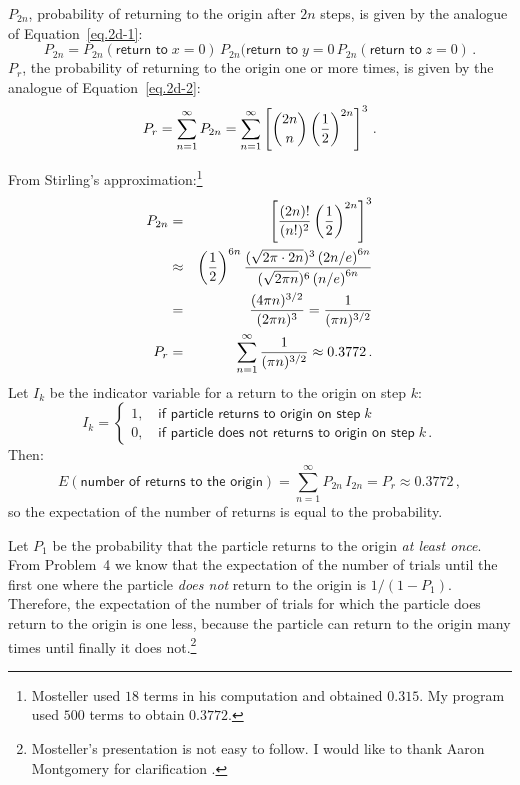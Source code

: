 $P_{2n}$, probability of returning to the origin after $2n$ steps, is given by the analogue of Equation~\ref{eq.2d-1}:
\[
P_{2n} =
P_{2n}(\textsf{return to}\;x=0)\,P_{2n}(\textsf{return to}\;y=0\, P_{2n}(\textsf{return to}\;z=0)\,.
\]
$P_r$, the probability of returning to the origin one or more times, is given by the analogue of Equation~\ref{eq.2d-2}:
\[
P_r =\sum_{n=1}^{\infty}P_{2n} =
\sum_{n=1}^{\infty}\left[\displaystyle{2n \choose n}\left(\displaystyle\frac{1}{2}\right)^{2n}\right]^3\,.
\]

From Stirling's approximation:\footnote{Mosteller used $18$ terms in his computation and obtained $0.315$. My program used $500$ terms to obtain $0.3772$.}
\begin{eqnarray*}
P_{2n} &=&
\left[\displaystyle\frac{(2n)!}{(n!)^2}
\left(\displaystyle\frac{1}{2}\right)^{2n}\right]^3 \\
&\approx&
\left(\displaystyle\frac{1}{2}\right)^{6n}
\displaystyle\frac{(\sqrt{2\pi \cdot 2n})^3
         \left(2n/e\right)^{6n}}{(\sqrt{2\pi n})^{6}
         \left(n/e\right)^{6n}} \\
&=&\displaystyle\frac{(4\pi n)^{3/2}}{(2\pi n)^3}=
 \displaystyle\frac{1}{(\pi n)^{3/2}}\\
P_r &=& \sum_{n=1}^{\infty}\displaystyle\frac{1}{(\pi n)^{3/2}}\approx 0.3772\,.
\end{eqnarray*}
Let $I_k$ be the indicator variable for a return to the origin on step $k$:
\begin{equation}
I_k=
\left\{
\begin{array}{ll}
1,\quad\textsf{if particle returns to origin on step}\;k\\
0, \quad\textsf{if particle does not returns to origin on step}\;k\,.
\end{array}
\right.
\end{equation}
Then:
\[
E(\textsf{number of returns to the origin})=\sum_{n=1}^{\infty}P_{2n}\, I_{2n} = P_r\approx 0.3772\,,
\]
so the expectation of the number of returns is equal to the probability.

 Let $P_1$ be the probability that the particle returns to the origin \emph{at least once}.  From Problem~4 we know that the expectation of the number of trials until the first one where the particle \emph{does not} return to the origin is $1/(1-P_1)$. Therefore, the expectation of the number of trials for which the particle does return to the origin is one less, because the particle can return to the origin many times until finally it does not.\footnote{Mosteller's presentation is not easy to follow. I would like to thank Aaron Montgomery for clarification \cite{montgomery}.}

